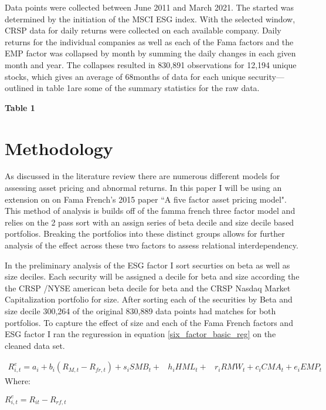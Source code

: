 \documentclass[12pt,oneside,reqno]{amsart}
\begin{document}
 Data points were collected between June 2011 and March 2021. The started was determined by the initiation of the MSCI ESG index. With the selected window, CRSP data for daily returns were collected on each available company. Daily returns for the individual companies as well as each of the Fama factors and the EMP factor was collapsed by month by summing the daily changes in each given month and year. The collapses resulted in 830,891 observations for 12,194 unique stocks, which gives an average of 68months of data for each unique security—outlined in table 1are some of the summary statistics for the raw data.


 
 \begin{center}
     \textbf{Table 1}\\
 
 \end{center}
 
\section{Methodology}
\label{Methodology}
As discussed in the literature review there are numerous different models for assessing asset pricing and abnormal returns. In this paper I will be using an extension on on Fama French's 2015 paper ``A five factor asset pricing model". This method of analysis is builds off of the famma french three factor model and relies on the 2 pass sort with an assign series of beta decile and size decile based portfolios. Breaking the portfolios into these distinct groups allows for further analysis of the effect across these two factors to assess relational interdependency. 

In the preliminary analysis of the ESG factor I sort securties  on beta as well as size deciles. Each security will be assigned a decile for beta and size according the the CRSP /NYSE american beta decile for beta and the CRSP Nasdaq Market Capitalization portfolio for size. After sorting each of the securities by Beta and size decile  300,264 of the original 830,889 data points had matches for both portfolios. To capture the effect of size and each of the Fama French factors and ESG factor I ran the reguression in equation \eqref{six_factor_basic_reg} on the cleaned data set. 






\begin{equation}
\begin{split}
    R_{i,t}^e = a_i+b_i(R_{M,t}-R_{fr,t})+s_iSMB_t+ & h_iHML_t+ & r_iRMW_t+c_iCMA_t+e_iEMP_t
    \end{split}
    \label{six_factor_basic_reg}
\end{equation}
Where:
\begin{center}
    $R_{i,t}^e = R_{it}-R_{rf,t}$
\end{center}
\end{document}

